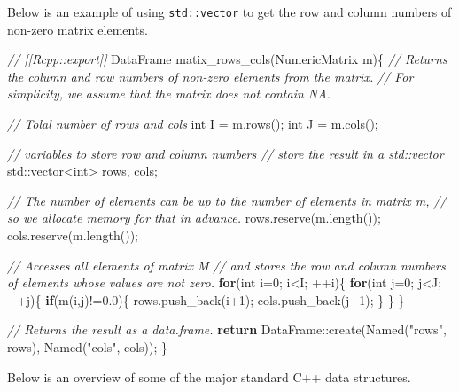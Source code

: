 \documentclass[]{book}
\newenvironment{Shaded}{\begin{snugshade}}{\end{snugshade}}
\newcommand{\BuiltInTok}[1]{#1}
\newcommand{\CommentTok}[1]{\textcolor[rgb]{0.56,0.35,0.01}{\textit{#1}}}
\newcommand{\ControlFlowTok}[1]{\textcolor[rgb]{0.13,0.29,0.53}{\textbf{#1}}}
\newcommand{\DataTypeTok}[1]{\textcolor[rgb]{0.13,0.29,0.53}{#1}}
\newcommand{\DecValTok}[1]{\textcolor[rgb]{0.00,0.00,0.81}{#1}}
\newcommand{\FloatTok}[1]{\textcolor[rgb]{0.00,0.00,0.81}{#1}}
\newcommand{\NormalTok}[1]{#1}
\newcommand{\StringTok}[1]{\textcolor[rgb]{0.31,0.60,0.02}{#1}}
\begin{document}
Below is an example of using \texttt{std::vector} to get the row and column numbers of non-zero matrix elements.

\begin{Shaded}
\begin{Highlighting}[]
\CommentTok{// [[Rcpp::export]]}
\NormalTok{DataFrame matix_rows_cols(NumericMatrix m)\{}
    \CommentTok{// Returns the column and row numbers of non-zero elements from the matrix.}
    \CommentTok{// For simplicity, we assume that the matrix does not contain NA.}

    \CommentTok{// Tolal number of rows and cols}
    \DataTypeTok{int}\NormalTok{ I = m.rows();}
    \DataTypeTok{int}\NormalTok{ J = m.cols();}

    \CommentTok{// variables to store row and column numbers}
    \CommentTok{// store the result in a std::vector}
    \BuiltInTok{std::}\NormalTok{vector<}\DataTypeTok{int}\NormalTok{> rows, cols;}

    \CommentTok{// The number of elements can be up to the number of elements in matrix m,}
    \CommentTok{// so we allocate memory for that in advance.}
\NormalTok{    rows.reserve(m.length());}
\NormalTok{    cols.reserve(m.length());}

    \CommentTok{// Accesses all elements of matrix M}
    \CommentTok{// and stores the row and column numbers of elements whose values are not zero.}
    \ControlFlowTok{for}\NormalTok{(}\DataTypeTok{int}\NormalTok{ i=}\DecValTok{0}\NormalTok{; i<I; ++i)\{}
        \ControlFlowTok{for}\NormalTok{(}\DataTypeTok{int}\NormalTok{ j=}\DecValTok{0}\NormalTok{; j<J; ++j)\{}
            \ControlFlowTok{if}\NormalTok{(m(i,j)!=}\FloatTok{0.0}\NormalTok{)\{}
\NormalTok{                rows.push_back(i}\DecValTok{+1}\NormalTok{);}
\NormalTok{                cols.push_back(j}\DecValTok{+1}\NormalTok{);}
\NormalTok{            \}}
\NormalTok{        \}}
\NormalTok{    \}}

    \CommentTok{// Returns the result as a data.frame.}
    \ControlFlowTok{return}\NormalTok{ DataFrame::create(Named(}\StringTok{"rows"}\NormalTok{, rows),}
\NormalTok{                             Named(}\StringTok{"cols"}\NormalTok{, cols));}
\NormalTok{\}}
\end{Highlighting}
\end{Shaded}

Below is an overview of some of the major standard C++ data structures.
\end{document}
